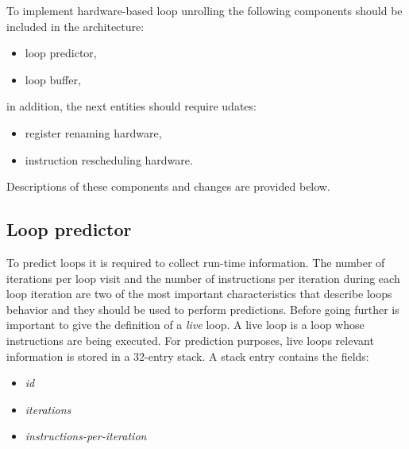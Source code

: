 \documentclass[11pt]{article}
\begin{document}
To implement hardware-based loop unrolling the following components should be included in the architecture:

\begin{itemize}
\item{loop predictor,}
\item{loop buffer,}    
\end{itemize}
in addition, the next entities should require udates:
\begin{itemize}
\item{register renaming hardware,}    
\item{instruction rescheduling hardware.}    
\end{itemize}
Descriptions of these components and changes are provided below.

\subsection{Loop predictor}
To predict loops it is required to collect run-time information. The number of iterations per loop visit and the number of instructions per iteration during each loop iteration are two of the most important characteristics that describe loops behavior and they should be used to perform predictions. Before going further is important to give the definition of a {\it live} loop. A live loop is a loop whose instructions are being executed. For prediction purposes, live loops relevant information is stored in a 32-entry stack. A stack entry contains the fields:

\begin{itemize}
\item{{\it id}}
\item{{\it iterations}}  
\item{{\it instructions-per-iteration}}
\end{itemize}
\end{document}
